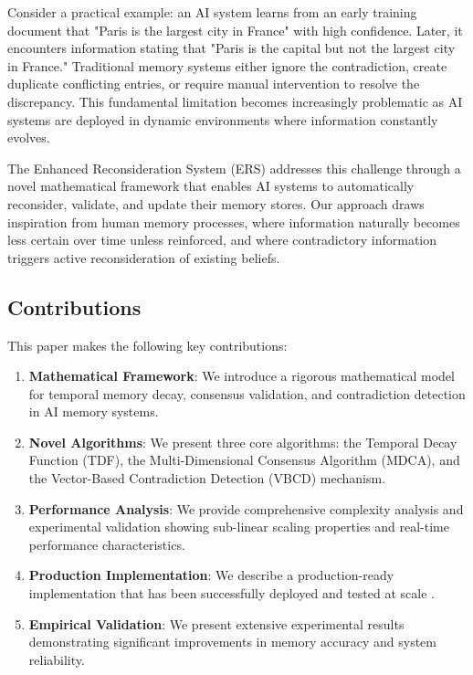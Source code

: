 \documentclass[12pt,a4paper]{article}
\begin{document}
Consider a practical example: an AI system learns from an early training document that "Paris is the largest city in France" with high confidence. Later, it encounters information stating that "Paris is the capital but not the largest city in France." Traditional memory systems either ignore the contradiction, create duplicate conflicting entries, or require manual intervention to resolve the discrepancy. This fundamental limitation becomes increasingly problematic as AI systems are deployed in dynamic environments where information constantly evolves.

The Enhanced Reconsideration System (ERS) addresses this challenge through a novel mathematical framework that enables AI systems to automatically reconsider, validate, and update their memory stores. Our approach draws inspiration from human memory processes, where information naturally becomes less certain over time unless reinforced, and where contradictory information triggers active reconsideration of existing beliefs.

\subsection{Contributions}

This paper makes the following key contributions:

\begin{enumerate}
\item \textbf{Mathematical Framework}: We introduce a rigorous mathematical model for temporal memory decay, consensus validation, and contradiction detection in AI memory systems.

\item \textbf{Novel Algorithms}: We present three core algorithms: the Temporal Decay Function (TDF), the Multi-Dimensional Consensus Algorithm (MDCA), and the Vector-Based Contradiction Detection (VBCD) mechanism.

\item \textbf{Performance Analysis}: We provide comprehensive complexity analysis and experimental validation showing sub-linear scaling properties and real-time performance characteristics.

\item \textbf{Production Implementation}: We describe a production-ready implementation that has been successfully deployed and tested at scale \cite{edwards2025reconsideration}.

\item \textbf{Empirical Validation}: We present extensive experimental results demonstrating significant improvements in memory accuracy and system reliability.
\end{enumerate}
\end{document}
